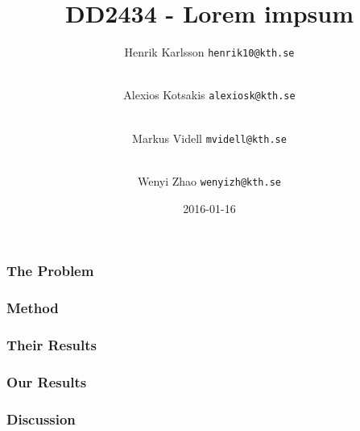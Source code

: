 \documentclass{beamer}
\title{DD2434 - Lorem impsum}
\author{
    Henrik Karlsson \texttt{henrik10@kth.se} \and \\
    Alexios Kotsakis \texttt{alexiosk@kth.se}\and \\
    Markus Videll \texttt{mvidell@kth.se}\and \\
    Wenyi Zhao \texttt{wenyizh@kth.se}\and
}
\institute{KTH}
\date{2016-01-16}
\begin{document}
\begin{frame}
    \titlepage
\end{frame}

\begin{frame}
    \frametitle{The Problem}
\end{frame}


\begin{frame}
    \frametitle{Method}
\end{frame}

\begin{frame}
    \frametitle{Their Results}
\end{frame}

\begin{frame}
    \frametitle{Our Results}
\end{frame}

\begin{frame}
    \frametitle{Discussion}
\end{frame}
\end{document}
